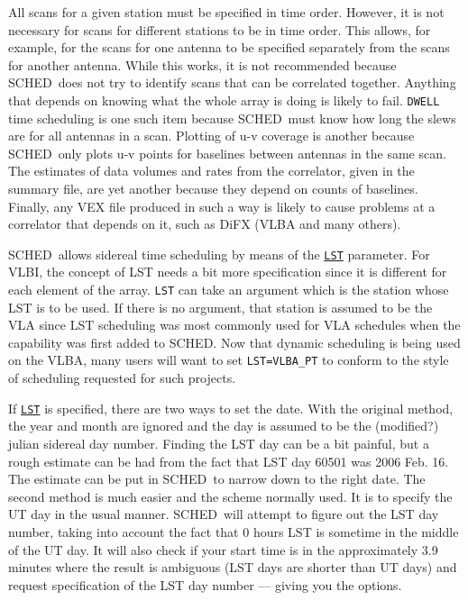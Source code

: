 \documentclass{report}
\newcommand{\sched}{{\sc SCHED}}
\newcommand{\schedb}{{\sc SCHED~}}
\begin{document}
All scans for a given station must be specified in time order.
However, it is not necessary for scans for different stations to be in
time order.  This allows, for example, for the scans for one antenna
to be specified separately from the scans for another antenna.  While
this works, it is not recommended because \schedb does not try to
identify scans that can be correlated together.  Anything that depends
on knowing what the whole array is doing is likely to fail.  {\tt DWELL}
time scheduling is one such item because \schedb must know how long
the slews are for all antennas in a scan.  Plotting of u-v coverage is
another because \schedb only plots u-v points for baselines between
antennas in the same scan.  The estimates of data volumes and rates
from the correlator, given in the summary file, are yet another
because they depend on counts of baselines.  Finally, any VEX file
produced in such a way is likely to cause problems at a correlator
that depends on it, such as DiFX (VLBA and many others).

\schedb allows sidereal time scheduling by means of the 
{\hyperref[MP:LST]{{\tt LST}}} parameter.
For VLBI, the concept of LST needs a bit more
specification since it is different for each element of the array.
{\tt LST} can take an argument which is the station whose LST is to be
used.  If there is no argument, that station is assumed to be the VLA
since LST scheduling was most commonly used for VLA schedules when
the capability was first added to \sched.  Now that dynamic scheduling
is being used on the VLBA, many users will want to set
{\tt LST=VLBA\_PT} to conform to the style of scheduling requested
for such projects.

If 
{\hyperref[MP:LST]{{\tt LST}}} is specified, there are two ways to set
the date.  With the original method, the year and month are ignored
and the day is assumed to be the (modified?) julian sidereal day
number.  Finding the LST day can be a bit painful, but a rough
estimate can be had from the fact that LST day 60501 was 2006 Feb. 16.
The estimate can be put in \schedb to narrow down to the right date.
The second method is much easier and the scheme normally used.  It is
to specify the UT day in the usual manner.  \schedb will attempt to
figure out the LST day number, taking into account the fact that 0
hours LST is sometime in the middle of the UT day.  It will also check
if your start time is in the approximately 3.9 minutes where the
result is ambiguous (LST days are shorter than UT days) and request
specification of the LST day number --- giving you the options.
\end{document}

